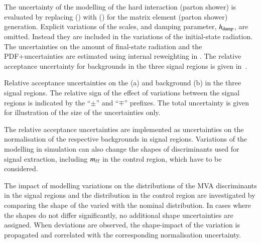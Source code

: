 The uncertainty of the modelling of the hard interaction (parton
shower) is evaluated by replacing \POWHEGBOX[v2] (\PYTHIA[8]) with
\MGNLO (\HERWIG[7]) for the matrix element (parton shower)
generation. Explicit variations of the scales, and \PYTHIA[8] damping
parameter, $h_\mathrm{damp}$, are omitted. Instead they are included in the
variations of the initial-state radiation. The uncertainties on the
amount of final-state radiation and the PDF+\alphas uncertainties are
estimated using internal reweighting in \PYTHIA[8]. The relative
acceptance uncertainty for \ttbar backgrounds in the three signal
regions is given in~.

\begin{table}[htbp]
  \centering

  \begin{subtable}[t]{0.95\textwidth}
    \centering

    
    \label{tab:uncertainties_zhf_extrapol}
  \end{subtable}

  \vspace{0.5em}

  \begin{subtable}[t]{0.95\textwidth}
    \centering

    
    \label{tab:uncertainties_ttbar_extrapol}
  \end{subtable}

  \caption{Relative acceptance uncertainties on the \ZHF (a) and
    \ttbar background (b) in the three signal regions. The relative
    sign of the effect of variations between the signal regions is
    indicated by the ``$\pm$'' and ``$\mp$'' prefixes. The total
    uncertainty is given for illustration of the size of the
    uncertainties only.}
\end{table}

The relative acceptance uncertainties are implemented as uncertainties
on the normalisation of the respective backgrounds in signal
regions. Variations of the modelling in simulation can also change the
shapes of discriminants used for signal extraction, including $m_{\ell\ell}$
in the \ZHF control region, which have to be considered.

The impact of modelling variations on the distributions of the MVA
discriminants in the signal regions and the \mll distribution in the
\ZHF control region are investigated by comparing the shape of the
varied with the nominal distribution. In cases where the shapes do not
differ significantly, no additional shape uncertainties are
assigned. When deviations are observed, the shape-impact of the
variation is propagated and correlated with the corresponding
normalisation uncertainty.

